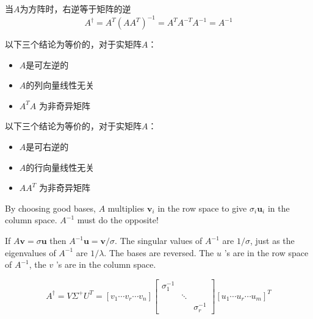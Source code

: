 \begin{theorem}
    当$A$为方阵时，右逆等于矩阵的逆
\begin{equation}
A^{\dagger}=A^{T}\left(A A^{T}\right)^{-1}=A^{T} A^{-T} A^{-1}=A^{-1}
\end{equation}
\end{theorem}

\begin{corollary}
    以下三个结论为等价的，对于实矩阵$A$：

    \begin{itemize}
        \item $A$是可左逆的
        \item $A$的列向量线性无关
        \item $ A^{T} A $ 为非奇异矩阵
    \end{itemize}
\end{corollary}

\begin{corollary}
    以下三个结论为等价的，对于实矩阵$A$：

    \begin{itemize}
        \item $A$是可右逆的 
        \item $A$的行向量线性无关
        \item $ A A^{T} $ 为非奇异矩阵
    \end{itemize}
\end{corollary}

By choosing good bases, $A$ multiplies $\boldsymbol{v}_{i}$ in the row space to give $\sigma_{i} \boldsymbol{u}_{i}$ in the column space. $A^{-1}$ must do the opposite! 



If $A \boldsymbol{v}=\sigma \boldsymbol{u}$ then $A^{-1} \boldsymbol{u}=\boldsymbol{v} / \sigma$. The singular values of $A^{-1}$ are $1 / \sigma$, just as the eigenvalues of $A^{-1}$ are $1 / \lambda$. The bases are reversed. The $u$ 's are in the row space of $A^{-1}$, the $v$ 's are in the column space.

\begin{definition}[伪逆$A^{\dagger}$]
    \begin{equation}A^{\dagger} = V \Sigma^+ U^T = \left[v_{1} \cdots v_{r} \cdots v_{n}\right]\left[\begin{array}{lll}
        \sigma_{1}^{-1} & & \\
        & \ddots & \\
        & & \sigma_{r}^{-1}
        \end{array}\right]\left[u_{1} \cdots u_{r} \cdots u_{m}\right]^{ {T}}\end{equation}
\end{definition}


